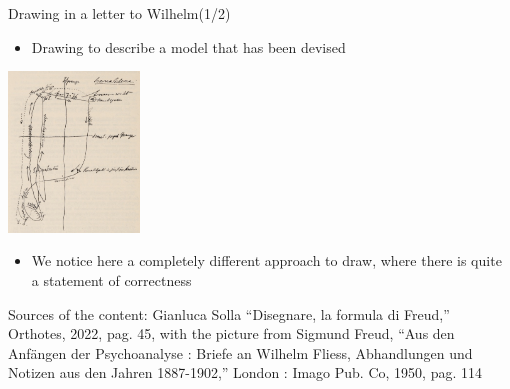 \documentclass{beamer}
\begin{document}
\begin{frame}
{\centerline{Drawing in a letter to Wilhelm(1/2)}}

\begin{itemize}
   \item Drawing to describe a model that has been devised
 \end{itemize} 


\begin{center}
 \includegraphics[width=3.5cm]{P2023.AIBCCSS.Drawing/schematizzazione.jpg}
 
 \end{center}

\begin{itemize}
   \item We notice here a completely different approach to draw, where there is quite a statement of correctness
 \end{itemize} 

\begin{center}
\tiny
Sources of the content: Gianluca Solla ``Disegnare, la formula di Freud,'' Orthotes, 2022, pag. 45, with the picture from Sigmund Freud, ``Aus den Anf\"{a}ngen der Psychoanalyse : Briefe an Wilhelm Fliess, Abhandlungen und Notizen aus den Jahren 1887-1902,'' London : Imago Pub. Co, 1950, pag. 114
\end{center}
\end{frame}
\end{document}
